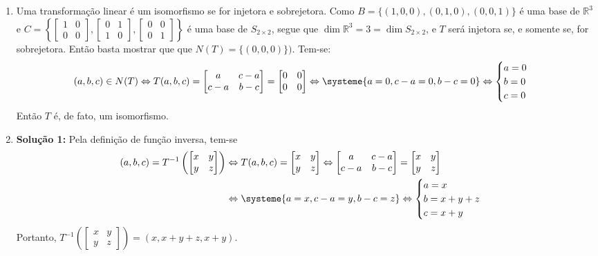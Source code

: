 \documentclass[12pt,a4paper]{article}
\newcommand*\R{\mathbb{R}}
\begin{document}
\begin{ExerciseList}
\Answer \begin{enumerate}
\item Uma transformação linear é um isomorfismo se for injetora e sobrejetora. Como $B = \{ (1,0,0), (0,1,0), (0,0,1)\}$ é uma base de $\R^3$ e $C = \left\{
\begin{bmatrix}
1 & 0\\
0 & 0
\end{bmatrix},
\begin{bmatrix}
0 & 1\\
1 & 0
\end{bmatrix},
\begin{bmatrix}
0 & 0\\
0 & 1
\end{bmatrix}
\right\}$ é uma base de $S_{2 \times 2}$, segue que $\dim{\R^3} = 3 = \dim{ S_{2 \times 2} }$, e $T$ será injetora se, e somente se, for sobrejetora. Então basta mostrar que que $N(T) = \{(0,0,0)\})$. Tem-se:
\[
(a,b,c) \in N(T)
\Leftrightarrow
T(a,b,c)
=
 \begin{bmatrix}
  a & c-a\\
c-a & b-c
\end{bmatrix}
=
\begin{bmatrix}
0 & 0\\
0 & 0
\end{bmatrix}
\Leftrightarrow
\systeme{
a=0,
c-a=0,
b-c=0
}
\Leftrightarrow
\begin{cases}
a=0\\
b=0\\
c=0
\end{cases}
\]
Então $T$ é, de fato, um isomorfismo.
\item \textbf{Solução 1:} Pela definição de função inversa, tem-se
\begin{align*}
(a,b,c)
= T^{-1}\left(
\begin{bmatrix}
x & y\\
y & z
\end{bmatrix}\right)
& \Leftrightarrow
T(a,b,c)
=
\begin{bmatrix}
x & y\\
y & z
\end{bmatrix}
\Leftrightarrow
\begin{bmatrix}
  a & c-a\\
c-a & b-c
\end{bmatrix}
=
\begin{bmatrix}
x & y\\
y & z
\end{bmatrix}\\
& \Leftrightarrow
\systeme{
a=x,
c-a=y,
b-c=z
}
\Leftrightarrow
\begin{cases}
a=x\\
b=x+y+z\\
c=x+y
\end{cases}
\end{align*}
Portanto, $T^{-1}\left(
\begin{bmatrix}
x & y\\
y & z
\end{bmatrix}\right) = (x,x+y+z,x+y)$.


\end{enumerate}
\end{ExerciseList}
\end{document}
